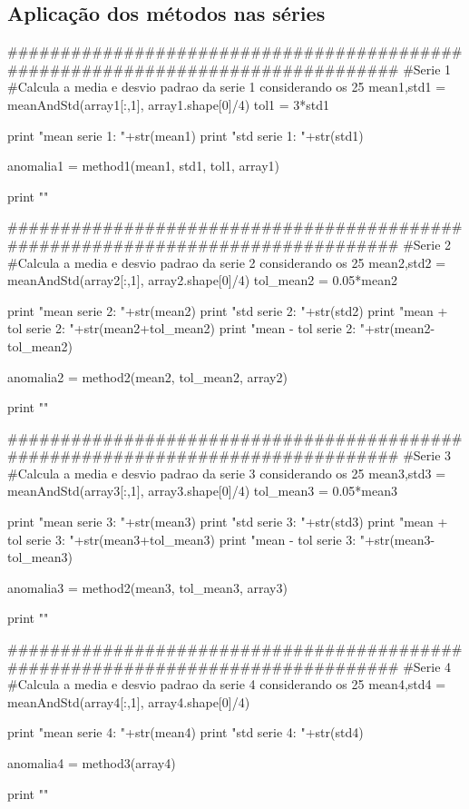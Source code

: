 \documentclass{article}
\begin{document}
\subsection{Aplicação dos métodos nas séries}
\begin{tcolorbox}
\begin{python}
################################################################################
#Serie 1
#Calcula a media e desvio padrao da serie 1 considerando os 25%
mean1,std1 = meanAndStd(array1[:,1], array1.shape[0]/4)
tol1 = 3*std1

print "mean serie 1: "+str(mean1)
print "std serie 1: "+str(std1)

anomalia1 = method1(mean1, std1, tol1, array1)

print "\n"

################################################################################
#Serie 2
#Calcula a media e desvio padrao da serie 2 considerando os 25%
mean2,std2 = meanAndStd(array2[:,1], array2.shape[0]/4)
tol_mean2 = 0.05*mean2

print "mean serie 2: "+str(mean2)
print "std serie 2: "+str(std2)
print "mean + tol serie 2: "+str(mean2+tol_mean2)
print "mean - tol serie 2: "+str(mean2-tol_mean2)

anomalia2 = method2(mean2, tol_mean2, array2)

print "\n"

################################################################################
#Serie 3
#Calcula a media e desvio padrao da serie 3 considerando os 25%
mean3,std3 = meanAndStd(array3[:,1], array3.shape[0]/4)
tol_mean3 = 0.05*mean3

print "mean serie 3: "+str(mean3)
print "std serie 3: "+str(std3)
print "mean + tol serie 3: "+str(mean3+tol_mean3)
print "mean - tol serie 3: "+str(mean3-tol_mean3)

anomalia3 = method2(mean3, tol_mean3, array3)

print "\n"

################################################################################
#Serie 4
#Calcula a media e desvio padrao da serie 4 considerando os 25%
mean4,std4 = meanAndStd(array4[:,1], array4.shape[0]/4)

print "mean serie 4: "+str(mean4)
print "std serie 4: "+str(std4)

anomalia4 = method3(array4)

print "\n"
\end{python}
\end{tcolorbox}
\end{document}
